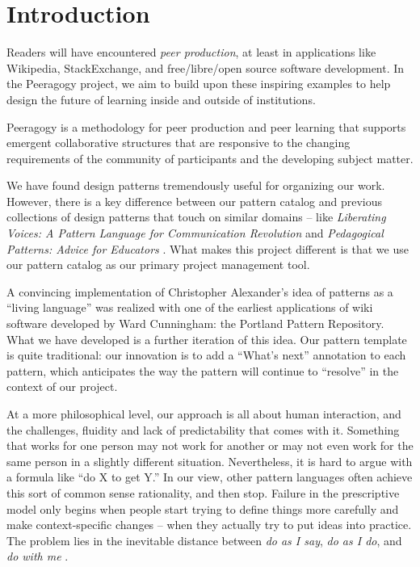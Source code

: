 
\section{Introduction}\label{sec:Introduction}

Readers will have encountered \emph{peer production}, at least in applications like Wikipedia, StackExchange, and free/libre/open source software development.   In the Peeragogy project,  we aim to build upon these inspiring examples to help design the future of learning inside and outside of institutions.  

Peeragogy is a methodology for peer production and peer learning that supports emergent collaborative structures that are responsive to the changing requirements of the community of participants and the developing subject matter.

We have found design patterns tremendously useful for organizing our work.  However, there is a key difference between our pattern catalog and previous collections of design patterns that touch on similar domains -- like \emph{Liberating Voices: A Pattern Language for Communication Revolution} \cite{schuler2008liberating} and \emph{Pedagogical Patterns: Advice for Educators} \cite{bergin2012pedagogical}.
What makes this project different is that we use our pattern catalog as our primary project management tool.



A convincing implementation of Christopher Alexander’s idea of patterns as a ``living language'' \cite[p.~xvii]{alexander1977pattern} was realized with one of the earliest applications of wiki software developed by Ward Cunningham: the Portland Pattern Repository.  What we have developed is a further iteration of this idea.   Our pattern template is quite traditional: our innovation is to add a ``What's next'' annotation to each pattern, which anticipates the way the pattern will continue to ``resolve'' in the context of our project. 


At a more philosophical level, our approach is all about human interaction, and the challenges, fluidity and lack of predictability that comes with it.  Something that works for one person may not work for another or may not even work for the same person in a slightly different situation.  Nevertheless, it is hard to argue with a formula like ``do X to get Y.'' In our view, other pattern languages often achieve this sort of common sense rationality, and then stop.  Failure in the prescriptive model only begins when people start trying to define things more carefully and make context-specific changes -- when they actually try to put ideas into practice.  The problem lies in the inevitable distance between \emph{do as I say}, \emph{do as I do}, and \emph{do with me} \cite[p.~26]{deleuze1994difference}.

